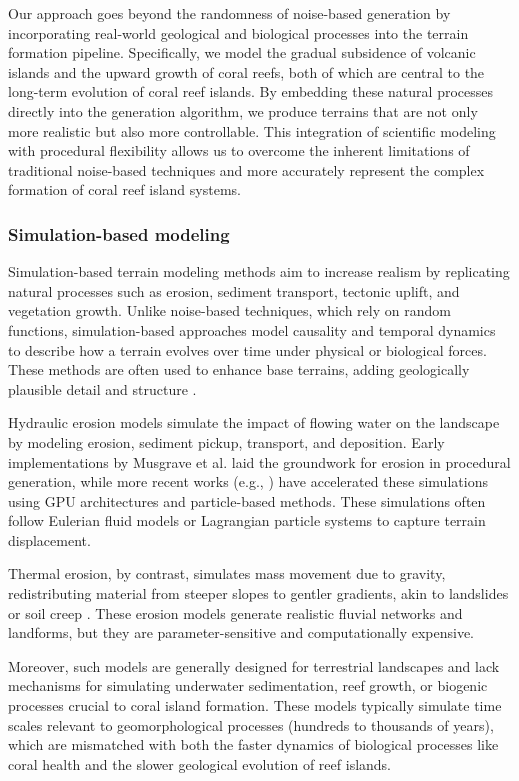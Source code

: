 Our approach goes beyond the randomness of noise-based generation by incorporating real-world geological and biological processes into the terrain formation pipeline. Specifically, we model the gradual subsidence of volcanic islands and the upward growth of coral reefs, both of which are central to the long-term evolution of coral reef islands. By embedding these natural processes directly into the generation algorithm, we produce terrains that are not only more realistic but also more controllable. This integration of scientific modeling with procedural flexibility allows us to overcome the inherent limitations of traditional noise-based techniques and more accurately represent the complex formation of coral reef island systems.

\subsubsection{Simulation-based modeling}

Simulation-based terrain modeling methods aim to increase realism by replicating natural processes such as erosion, sediment transport, tectonic uplift, and vegetation growth. Unlike noise-based techniques, which rely on random functions, simulation-based approaches model causality and temporal dynamics to describe how a terrain evolves over time under physical or biological forces. These methods are often used to enhance base terrains, adding geologically plausible detail and structure \cite{Benes2006, Smelik2009}.


Hydraulic erosion models simulate the impact of flowing water on the landscape by modeling erosion, sediment pickup, transport, and deposition. Early implementations by Musgrave et al. \cite{Musgrave1989} laid the groundwork for erosion in procedural generation, while more recent works (e.g., \cite{Mei2007}) have accelerated these simulations using GPU architectures and particle-based methods. These simulations often follow Eulerian fluid models or Lagrangian particle systems to capture terrain displacement.

Thermal erosion, by contrast, simulates mass movement due to gravity, redistributing material from steeper slopes to gentler gradients, akin to landslides or soil creep \cite{Benes2006}. These erosion models generate realistic fluvial networks and landforms, but they are parameter-sensitive and computationally expensive.

Moreover, such models are generally designed for terrestrial landscapes and lack mechanisms for simulating underwater sedimentation, reef growth, or biogenic processes crucial to coral island formation. These models typically simulate time scales relevant to geomorphological processes (hundreds to thousands of years), which are mismatched with both the faster dynamics of biological processes like coral health and the slower geological evolution of reef islands.

